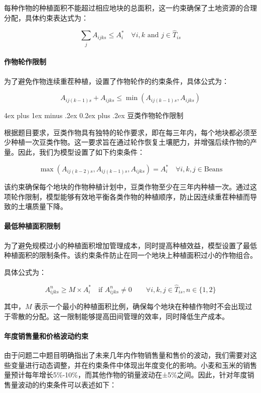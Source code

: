 \documentclass[12pt,a4paper]{nmmcm}
\makeatletter
\renewcommand\subsubsection{\@startsection{subsubsection}{3}{1em}%
  {4ex plus 1ex minus .2ex}%
  {0.2ex plus .2ex}%
  {\normalfont\large\bfseries}}
\makeatother
\begin{document}
每种作物的种植面积不能超过相应地块的总面积，这一约束确保了土地资源的合理分配，具体约束表达式为：

\[
  \sum_j A_{ijks} \leq A_i^* \quad \forall i,k \text{ and } j \in \hat{T}_{is}
\]

\paragraph{作物轮作限制}

为了避免作物连续重茬种植，设置了作物轮作的约束条件，具体公式为：

\[
  A_{ij(k-1)s} + A_{ijks} \leq \min(A_{ij(k-1)s}, A_{ijks})
\]

\subsubsection{豆类作物轮作限制}

根据题目要求，豆类作物具有独特的轮作要求，即在每三年内，每个地块都必须至少种植一次豆类作物。这一要求旨在通过轮作恢复土壤肥力，并增强后续作物的产量。因此，我们为模型设置了如下约束条件：

\[
  \max(A_{ij(k-2)s}, A_{ij(k-1)s}, A_{ijks}) = A_i^* \quad \forall i,k,j \in \text{Beans}
\]

该约束确保每个地块的作物种植计划中，豆类作物至少在三年内种植一次。通过这项轮作限制，模型能够有效地平衡各类作物的种植顺序，防止因连续重茬种植而导致的土壤质量下降。

\paragraph{最低种植面积限制}

为了避免规模过小的种植面积增加管理成本，同时提高种植效益，模型设置了最低种植面积的限制条件。该约束条件防止在同一个地块上种植面积过小的作物组合。

具体公式为：

\[
  A_{ijks}^{n} \geq M \times A_i^*  \quad \text{if } A_{ijks}^{n} \neq 0 \qquad \forall i,k,j \in \hat{T}_{is},n \in \{1,2\}
\]

其中，$M$ 表示一个最小的种植面积比例，确保每个地块在种植作物时不会出现过于零散的分配。这一限制能够提高田间管理的效率，同时降低生产成本。

\paragraph{年度销售量和价格波动约束}

由于问题二中题目明确指出了未来几年内作物销售量和售价的波动，我们需要对这些变量进行动态调整，并在约束条件中体现出年度变化的影响。小麦和玉米的销售量预计每年增长5\%-10\%，而其他作物的销量波动在±5\%之间。因此，针对年度销售量波动的约束条件可以表述如下：
\end{document}
